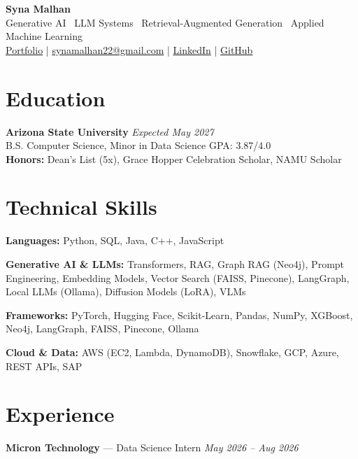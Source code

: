 \documentclass[a4paper,8pt]{extarticle}
\begin{document}
\begin{center}
{\Large \textbf{Syna Malhan}}\\
Generative AI \textbullet\  LLM Systems \textbullet\  Retrieval-Augmented Generation \textbullet\  Applied Machine Learning\\
\href{https://synamalhan.github.io/website/}{Portfolio}
\;|\;
\href{mailto:synamalhan22@gmail.com}{synamalhan22@gmail.com}
\;|\;
\href{https://www.linkedin.com/in/synamalhan/}{LinkedIn}
\;|\;
\href{https://github.com/synamalhan}{GitHub}
\end{center}

\section*{Education}

\noindent
\textbf{Arizona State University} \hfill \textit{Expected May 2027}\\
\noindent
B.S. Computer Science, Minor in Data Science \hfill GPA: 3.87/4.0\\
\noindent
\textbf{Honors:} Dean's List (5x), Grace Hopper Celebration Scholar, NAMU Scholar

\section*{Technical Skills}

\noindent
\textbf{Languages:} Python, SQL, Java, C++, JavaScript

\noindent
\textbf{Generative AI \& LLMs:} Transformers, RAG, Graph RAG (Neo4j), Prompt Engineering, Embedding Models, Vector Search (FAISS, Pinecone), LangGraph, Local LLMs (Ollama), Diffusion Models (LoRA), VLMs

\noindent
\textbf{Frameworks:} PyTorch, Hugging Face, Scikit-Learn, Pandas, NumPy, XGBoost, Neo4j, LangGraph, FAISS, Pinecone, Ollama

\noindent
\textbf{Cloud \& Data:} AWS (EC2, Lambda, DynamoDB), Snowflake, GCP, Azure, REST APIs, SAP

\section*{Experience}

\noindent
\textbf{Micron Technology} --- Data Science Intern
\hfill \textit{May 2026 -- Aug 2026}
\end{document}
